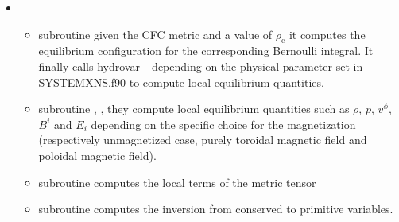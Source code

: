 \documentclass[letterpaper,10pt,english]{sphinxmanual}
\begin{document}
\begin{itemize}
\begin{itemize}
\item {} 
\sphinxAtStartPar
subroutine  \sphinxhyphen{} given \(p\), it computes the \(\rho\) according to the tabulated EoS.

\item {} 
\sphinxAtStartPar
subroutine  \sphinxhyphen{} given \(h\), it computes the \(\rho\) according to the tabulated EoS.

\item {} 
\sphinxAtStartPar
subroutine  \sphinxhyphen{} computes the density and the internal energy given the pressure, both in case the EoS is tabulated or an analytical polytropic.

\item {} 
\sphinxAtStartPar
subroutine  \sphinxhyphen{} used by the root\sphinxhyphen{}finding subroutine to derive the central pressure given
the central density.


\end{itemize}

\item {} 
\sphinxAtStartPar
{}
\begin{itemize}
\item {} 
\sphinxAtStartPar
subroutine  \sphinxhyphen{} given the CFC metric and a value of \(\rho _\mathrm{c}\) it computes the equilibrium
configuration for the corresponding Bernoulli integral. It finally calls
hydrovar\_ depending on the physical parameter set in SYSTEMXNS.f90 to compute local
equilibrium quantities.

\item {} 
\sphinxAtStartPar
subroutine , ,  \sphinxhyphen{} they compute local equilibrium
quantities such as \(\rho\), \(p\), \(v^\phi\), \(B^i\) and \(E_i\) depending on the specific choice for the magnetization (respectively unmagnetized case, purely toroidal magnetic field and poloidal magnetic field).

\item {} 
\sphinxAtStartPar
subroutine  \sphinxhyphen{} computes the local terms of the metric tensor

\item {} 
\sphinxAtStartPar
subroutine  \sphinxhyphen{} computes the inversion from conserved to primitive variables.


\end{itemize}
\end{itemize}
\end{document}
